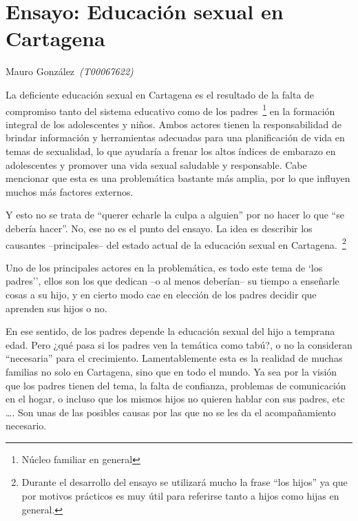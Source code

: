 \documentclass[letterpaper, 12pt]{article}
\begin{document}
\section*{Ensayo: Educación sexual en Cartagena}

\noindent\makebox[\linewidth]{\rule{\textwidth}{0.4pt}}

Mauro González~\textit{(T00067622)}

\noindent\makebox[\linewidth]{\rule{\textwidth}{0.4pt}}

\bigskip


La deficiente educación sexual en Cartagena es el resultado
de la falta de compromiso tanto del sistema educativo como
de los padres~\footnote{Núcleo familiar en general} en la
formación integral de los adolescentes y niños. Ambos
actores tienen la responsabilidad de brindar información y
herramientas adecuadas para una planificación de vida en
temas de sexualidad, lo que ayudaría a frenar los altos
índices de embarazo en adolescentes y promover una vida
sexual saludable y responsable. Cabe mencionar que esta es
una problemática bastante más amplia, por lo que influyen
muchos más factores externos.

Y esto no se trata de ``querer echarle la culpa a alguien''
por no hacer lo que ``se debería hacer''. No, ese no es el
punto del ensayo. La idea es describir los causantes
--principales-- del estado actual de la educación sexual en
Cartagena.~\footnote{Durante el desarrollo del ensayo se
    utilizará mucho la frase ``los hijos'' ya que por motivos
    prácticos es muy útil para referirse tanto a hijos como
    hijas en general.}

Uno de los principales actores en la problemática, es todo
este tema de `los padres'', ellos son los que dedican --o
al menos deberían-- su tiempo a enseñarle cosas a su hijo,
y en cierto modo cae en elección de los padres decidir que
aprenden sus hijos o no.

En ese sentido, de los padres depende la educación sexual
del hijo a temprana edad. Pero ¿qué pasa si los padres ven
la temática como tabú?, o no la consideran ``necesaria''
para el crecimiento. Lamentablemente esta es la realidad de
muchas familias no solo en Cartagena, sino que en todo el
mundo. Ya sea por la visión que los padres tienen del tema,
la falta de confianza, problemas de comunicación en el
hogar, o incluso que los mismos hijos no quieren hablar con
sus padres, etc \dots. Son unas de las posibles causas por
las que no se les da el acompañamiento necesario.
\end{document}
